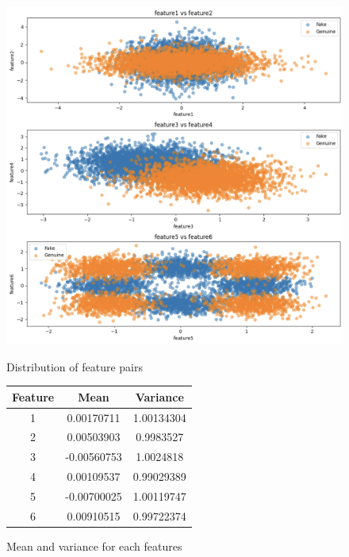 \documentclass{article}
\begin{document}
\begin{figure}[ht]
    \begin{minipage}[b]{0.45\textwidth}
        \centering
        \includegraphics[width=\textwidth]{./img/image2.png}
        \caption{Distribution of feature pairs}
        \label{fig:PairFeatures}
    \end{minipage}
    \hfill %
    \begin{minipage}[b]{0.45\textwidth}
        \centering
        \begin{tabular}{ccc}
            \hline
            Feature & Mean & Variance \\ \hline
            1 & 0.00170711 & 1.00134304 \\
            2 & 0.00503903 & 0.9983527 \\
            3 & -0.00560753 & 1.0024818 \\
            4 & 0.00109537 & 0.99029389\\
            5 & -0.00700025 & 1.00119747 \\
            6 & 0.00910515 & 0.99722374 \\ \hline
        \end{tabular}
        \caption{Mean and variance for each features}
        \label{tab:mean-variance}
    \end{minipage}
\end{figure}
\end{document}
